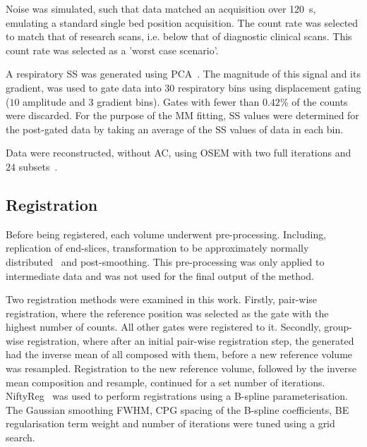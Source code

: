                 Noise was simulated, such that data matched an acquisition over \SI{120}{\second}, emulating a standard single bed position acquisition. The count rate was selected to match that of research scans, i.e. below that of diagnostic clinical scans. This count rate was selected as a 'worst case scenario'.
                
                A respiratory \gls{SS} was generated using \gls{PCA}~. The magnitude of this signal and its gradient, was used to gate data into $30$ respiratory bins using displacement gating ($10$ amplitude and $3$ gradient bins). Gates with fewer than $0.42$\% of the counts were discarded. For the purpose of the \gls{MM} fitting, \gls{SS} values were determined for the post-gated data by taking an average of the \gls{SS} values of data in each bin.
                
                Data were reconstructed, without \gls{AC}, using \gls{OSEM} with two full iterations and $24$ subsets~.
            
            \subsection{Registration} \label{sec:comparison_of_motion_correction_methods_incorporating_motion_modelling_for_pet/ct_using_a_single_breath_hold_attenuation_map_registration}
                Before being registered, each volume underwent pre-processing. Including, replication of end-slices, transformation to be approximately normally distributed~ and post-smoothing. This pre-processing was only applied to intermediate data and was not used for the final output of the method.%
                
                Two registration methods were examined in this work. Firstly, pair-wise registration, where the reference position was selected as the gate with the highest number of counts. All other gates were registered to it. Secondly, group-wise registration, where after an initial pair-wise registration step, the  generated had the inverse mean of all  composed with them, before a new reference volume was resampled. Registration to the new reference volume, followed by the inverse mean composition and resample, continued for a set number of iterations. NiftyReg~ was used to perform registrations using a B-spline parameterisation. The Gaussian smoothing \gls{FWHM}, \gls{CPG} spacing of the B-spline coefficients, \gls{BE} regularisation term weight and number of iterations were tuned using a grid search.
            
